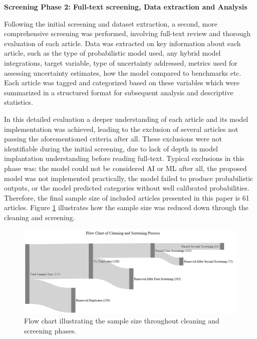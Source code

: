 


\textbf{Screening Phase 2: Full-text screening, Data extraction and Analysis}\nopagebreak

Following the initial screening and dataset extraction, a second, more comprehensive screening was performed, involving full-text review and thorough evaluation of each article. Data was extracted on key information about each article, such as the type of probabilistic model used, any hybrid model integrations, target variable, type of uncertainty addressed, metrics used for assessing uncertainty estimates, how the model compared to benchmarks etc. Each article was tagged and categorized based on these variables which were summarized in a structured format for subsequent analysis and descriptive statistics. 

In this detailed evaluation a deeper understanding of each article and its model implementation was achieved, leading to the exclusion of several articles not passing the aforementioned criteria after all. These exclusions were not identifiable during the initial screening, due to lack of depth in model implantation understanding before reading full-text. Typical exclusions in this phase was: the model could not be considered AI or ML after all, the proposed model was not implemented practically, the model failed to produce probabilistic outputs, or the model predicted categories without well calibrated probabilities. Therefore, the final sample size of included articles presented in this paper is 61 articles. Figure \ref{fig:screening_and_cleaning_funnel} illustrates how the sample size was reduced down through the cleaning and screening. 

  \begin{figure}[h]
      \centering
      \includegraphics[width=1\linewidth]{Images/screening_funnel.png}
      \caption{Flow chart illustrating the sample size throughout cleaning and screening phases.}
      \label{fig:screening_and_cleaning_funnel}
  \end{figure}


